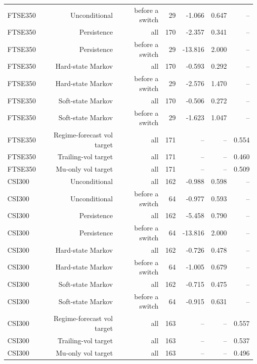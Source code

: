\begin{tabular}{lrrrrrr}
FTSE350 & Unconditional & before a switch & 29 & -1.066 & 0.647 & -- \\
FTSE350 & Persistence & all & 170 & -2.357 & 0.341 & -- \\
FTSE350 & Persistence & before a switch & 29 & -13.816 & 2.000 & -- \\
FTSE350 & Hard-state Markov & all & 170 & -0.593 & 0.292 & -- \\
FTSE350 & Hard-state Markov & before a switch & 29 & -2.576 & 1.470 & -- \\
FTSE350 & Soft-state Markov & all & 170 & -0.506 & 0.272 & -- \\
FTSE350 & Soft-state Markov & before a switch & 29 & -1.623 & 1.047 & -- \\
FTSE350 & Regime-forecast vol target & all & 171 & -- & -- & 0.554 \\
FTSE350 & Trailing-vol target & all & 171 & -- & -- & 0.460 \\
FTSE350 & Mu-only vol target & all & 171 & -- & -- & 0.509 \\
CSI300 & Unconditional & all & 162 & -0.988 & 0.598 & -- \\
CSI300 & Unconditional & before a switch & 64 & -0.977 & 0.593 & -- \\
CSI300 & Persistence & all & 162 & -5.458 & 0.790 & -- \\
CSI300 & Persistence & before a switch & 64 & -13.816 & 2.000 & -- \\
CSI300 & Hard-state Markov & all & 162 & -0.726 & 0.478 & -- \\
CSI300 & Hard-state Markov & before a switch & 64 & -1.005 & 0.679 & -- \\
CSI300 & Soft-state Markov & all & 162 & -0.715 & 0.475 & -- \\
CSI300 & Soft-state Markov & before a switch & 64 & -0.915 & 0.631 & -- \\
CSI300 & Regime-forecast vol target & all & 163 & -- & -- & 0.557 \\
CSI300 & Trailing-vol target & all & 163 & -- & -- & 0.537 \\
CSI300 & Mu-only vol target & all & 163 & -- & -- & 0.496 \\
\bottomrule
\end{tabular}
